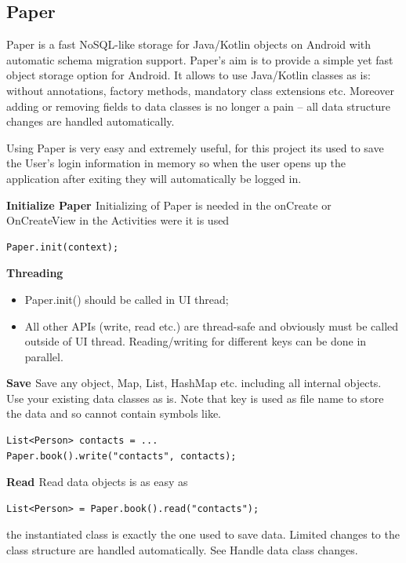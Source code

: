 \subsection{Paper}
\par
\medskip
Paper is a fast NoSQL-like storage for Java/Kotlin objects on Android with automatic schema migration support.
Paper's aim is to provide a simple yet fast object storage option for Android. It allows to use Java/Kotlin classes as is: without annotations, factory methods, mandatory class extensions etc. Moreover adding or removing fields to data classes is no longer a pain – all data structure changes are handled automatically.\newline

Using Paper is very easy and extremely useful, for this project its used to save the User's login information in memory so when the user opens up the application after exiting they will automatically be logged in.\newline

\textbf{Initialize Paper \cite{paper}}
Initializing of Paper is needed in the onCreate or OnCreateView in the Activities were it is used
\begin{verbatim}
Paper.init(context);
\end{verbatim}

\textbf{Threading \cite{paper}}
\begin{itemize}
    \item Paper.init() should be called in UI thread;
    \item All other APIs (write, read etc.) are thread-safe and obviously must be called outside of UI thread. Reading/writing for different keys can be done in parallel.
\end{itemize}

\textbf{Save \cite{paper}}
Save any object, Map, List, HashMap etc. including all internal objects. Use your existing data classes as is. Note that key is used as file name to store the data and so cannot contain symbols like\/.

\begin{verbatim}
List<Person> contacts = ...
Paper.book().write("contacts", contacts);
\end{verbatim}

\textbf{Read \cite{paper}}
Read data objects is as easy as
\begin{verbatim}
List<Person> = Paper.book().read("contacts");
\end{verbatim}
the instantiated class is exactly the one used to save data. Limited changes to the class structure are handled automatically. See Handle data class changes.

